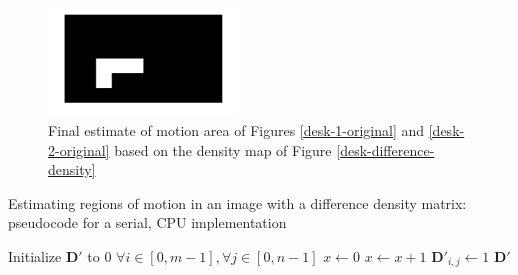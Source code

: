 \documentclass[journal]{IEEEtran}
\begin{document}
\begin{figure}[]
	\centering
	\includegraphics[width=0.45\textwidth]{desk_motion_area.jpg}
	\caption{Final estimate of motion area of Figures \ref{desk-1-original} and \ref{desk-2-original} based on the density map of Figure \ref{desk-difference-density}}
    \label{desk-motion-area}
\end{figure}
\begin{algorithm}[]
	\smaller
	\label{difference-density-matrix-algorithm}
	\caption{Estimating regions of motion in an image with a difference density matrix: pseudocode for a serial, CPU implementation}
	
	
	\nl Initialize $\boldsymbol{D}'$ to 0 $\forall i \in [0, m - 1], \forall j \in [0, n - 1]$\;
	\nl {} {
		\nl {} {
			\nl $x \gets 0$
			\nl {} {
				\nl {} {
					\nl {} {
						\nl $x \gets x + 1$\;
					}
				}
			}
			\nl {} {
				\nl $\boldsymbol{D}'_{i, j} \gets 1$\;
			}
		}
	}
	\nl \Return $\boldsymbol{D}'$\;
	\
\end{algorithm}
\end{document}
